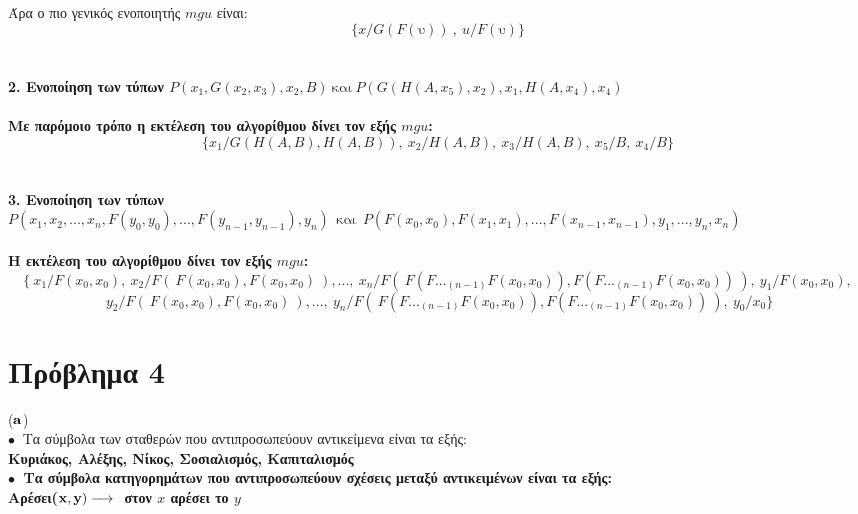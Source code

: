 \documentclass[10pt]{article}
\begin{document}
Άρα ο πιο γενικός ενοποιητής $mgu$ είναι:
\[
\{x/ G(F(\text{υ})) \ , \ u/ F(\text{υ})\}
\]
 \\ \\
\bf 2. \normalfont Ενοποίηση των τύπων 
$P(x_1, G(x_2, x_3), x_2, B) \  \text{και} \ P(G(H(A, x_5), x_2), x_1, H(A, x_4), x_4)$ \\ \\
Με παρόμοιο τρόπο η εκτέλεση του αλγορίθμου δίνει τον εξής $mgu$: \\

\[
\{x_1/G(H(A,B),H(A,B)), \ x_2/H(A,B),\ x_3/H(A,B), \ x_5/B, \ x_4/B\}  
\]
 \\ \\
\bf 3. \normalfont Ενοποίηση των τύπων  \\

$P(x_1, x_2, . . . , x_n, F(y_0, y_0), . . . , F(y_{n-1}, y_{n-1}), y_n) \  \ \text{και} \  \ P(F(x_0, x_0), F(x_1, x_1), . . . , F(x_{n-1}, x_{n-1}), y_1, . . . , y_n, x_n)$ \\ \\
Η εκτέλεση του αλγορίθμου δίνει τον εξής $mgu$: \\
\[
\{ \ x_1/F(x_0, x_0), \ x_2/F( \ F(x_0, x_0),F(x_0, x_0)\ ),..., \ x_n/F( \ F(F..._{(n-1)}F(x_0,x_0)),F(F..._{(n-1)}F(x_0,x_0)) \ ), \ y_1/F(x_0, x_0),\]
\[
\ y_2/F( \ F(x_0, x_0),F(x_0, x_0)\ ),..., \ y_n/F( \ F(F..._{(n-1)}F(x_0,x_0)),F(F..._{(n-1)}F(x_0,x_0)) \ ),\ y_0/x_0\}  
\]


\section*{Πρόβλημα 4}
\vspace{5mm}
($\bf a$) \normalfont \\

$\bullet \ $ Τα σύμβολα των σταθερών που αντιπροσωπεύουν αντικείμενα είναι τα εξής: \\ 

\hspace{25mm} \bf Κυριάκος, Αλέξης, Νίκος, Σοσιαλισμός, Καπιταλισμός \normalfont \\

$\bullet \ $ Τα σύμβολα κατηγορημάτων που αντιπροσωπεύουν σχέσεις μεταξύ αντικειμένων είναι τα εξής: \\

\hspace{25mm} \bf Αρέσει($ \bf x,y) \longrightarrow \ $  \normalfont στον $x$ αρέσει το $y$ \\
\end{document}
